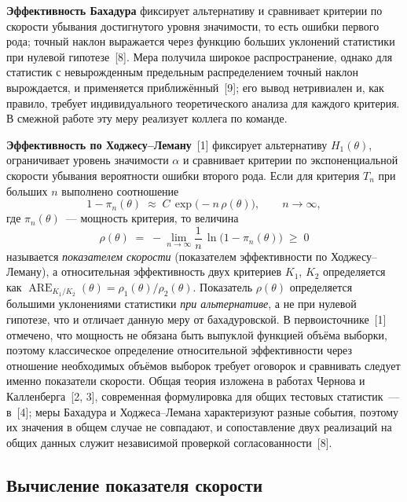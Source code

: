 \textbf{Эффективность Бахадура} фиксирует альтернативу и сравнивает критерии по скорости
убывания достигнутого уровня значимости, то есть ошибки первого рода; точный наклон
выражается через функцию больших уклонений статистики при нулевой гипотезе~[8]. Мера
получила широкое распространение, однако для статистик с невырожденным предельным
распределением точный наклон вырождается, и применяется приближённый~[9]; его вывод
нетривиален и, как правило, требует индивидуального теоретического анализа для каждого
критерия. В смежной работе эту меру реализует коллега по команде.

\textbf{Эффективность по Ходжесу--Леману}~[1] фиксирует альтернативу $H_1(\theta)$, ограничивает уровень значимости
$\alpha$ и сравнивает критерии по экспоненциальной скорости убывания вероятности ошибки
второго рода. Если для критерия $T_n$ при больших $n$ выполнено соотношение
\begin{equation}
  1 - \pi_n(\theta) \;\approx\; C\,\exp\!\bigl(-n\,\rho(\theta)\bigr),
  \qquad n \to \infty,
  \label{eq:hl-decay}
\end{equation}
где $\pi_n(\theta)$~--- мощность критерия, то величина
\begin{equation}
  \rho(\theta) \;=\; -\lim_{n\to\infty}\frac{1}{n}\,
  \ln\!\bigl(1-\pi_n(\theta)\bigr) \;\ge\; 0
  \label{eq:hl-rho}
\end{equation}
называется \emph{показателем скорости} (показателем эффективности по Ходжесу--Леману), а
относительная эффективность двух критериев $K_1$, $K_2$ определяется как
$\operatorname{ARE}_{K_1/K_2}(\theta) = \rho_1(\theta)/\rho_2(\theta)$. Показатель
$\rho(\theta)$ определяется большими уклонениями статистики \emph{при альтернативе}, а не
при нулевой гипотезе, что и отличает данную меру от бахадуровской. В первоисточнике~[1]
отмечено, что мощность не обязана быть выпуклой функцией объёма выборки, поэтому
классическое определение относительной эффективности через отношение необходимых объёмов
выборок требует оговорок и сравнивать следует именно показатели скорости. Общая теория изложена
в работах Чернова и Калленберга~[2, 3], современная формулировка для общих тестовых
статистик~--- в~[4]; меры Бахадура и Ходжеса--Лемана характеризуют разные события, поэтому
их значения в общем случае не совпадают, и сопоставление двух реализаций на общих данных
служит независимой проверкой согласованности~[8].

\subsection{Вычисление показателя скорости}
\label{ssec:routes}

